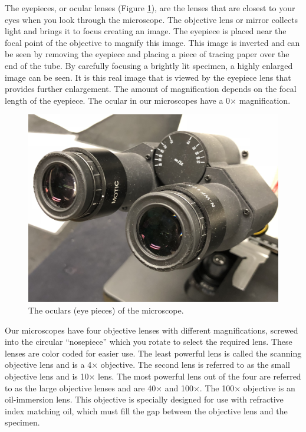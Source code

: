The eyepieces, or ocular lenses (Figure \ref{fig:oculars}), are the
lenses that are closest to your eyes when you look through the
microscope. The objective lens or mirror collects light and brings it to
focus creating an image. The eyepiece is placed near the focal point of
the objective to magnify this image. This image is inverted and can be
seen by removing the eyepiece and placing a piece of tracing paper over
the end of the tube. By carefully focusing a brightly lit specimen, a
highly enlarged image can be seen. It is this real image that is viewed
by the eyepiece lens that provides further enlargement. The amount of
magnification depends on the focal length of the eyepiece. The ocular in
our microscopes have a 0× magnification.

\begin{figure}

{\centering \includegraphics[width=0.7\linewidth]{./figures/microscope/Oculars}

}

\caption{The oculars (eye pieces) of the microscope.}\label{fig:oculars}
\end{figure}

Our microscopes have four objective lenses with different
magnifications, screwed into the circular ``nosepiece'' which you rotate
to select the required lens. These lenses are color coded for easier
use. The least powerful lens is called the scanning objective lens and
is a 4× objective. The second lens is referred to as the small objective
lens and is 10× lens. The most powerful lens out of the four are
referred to as the large objective lenses and are 40× and 100×. The 100×
objective is an oil-immersion lens. This objective is specially designed
for use with refractive index matching oil, which must fill the gap
between the objective lens and the specimen.

